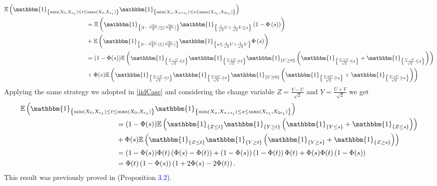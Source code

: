 \documentclass[12pt]{article}
\theoremstyle{Theorem}
\theoremstyle{definition}
\begin{document}
{\small
\begin{align*}
\mathbb{E}\left(\mathbbm{1}_{\left\{\min(X_{\scriptscriptstyle 0}, X_{e_1}) \leq t \leq \max(X_{\scriptscriptstyle 0}, X_{e_1})\right\}}\mathbbm{1}_{\left\{\min(X_{\scriptscriptstyle x}, X_{x+e_i}) \leq s \leq \max(X_{e_1}, X_{2e_1}) \right\}}\right) & \\
& \hspace{-9cm} = \mathbb{E}\left(\mathbbm{1}_{\left\{ |t - \frac{\sqrt{2}V}{2}| \leq |\frac{\sqrt{2}U}{2}|\right\}}\mathbbm{1}_{\left\{\frac{1}{\sqrt{2}} U + \frac{1}{\sqrt{2}}V \leq s\right\}} \left(1 - \Phi\left(s\right)\right)\right) \\
& \hspace{-9cm} + \mathbb{E}\left(\mathbbm{1}_{\left\{ |t - \frac{\sqrt{2}V}{2}| \leq |\frac{\sqrt{2}U}{2}|\right\}}\mathbbm{1}_{\left\{ s \leq \frac{1}{\sqrt{2}}U + \frac{1}{\sqrt{2}}V \right\}}\Phi\left(s\right)\right) \\
& \hspace{-9cm} = (1-\Phi(s))\mathbb{E}\left(\mathbbm{1}_{\left\{\frac{V-U}{\sqrt{2}} \leq t \right\}}\mathbbm{1}_{\left\{\frac{V+U}{\sqrt{2}} \geq t \right\}}\mathbbm{1}_{\left\{U \geq 0\right\}}\left(\mathbbm{1}_{\left\{\frac{V+U}{\sqrt{2}} \leq s \right\}} + \mathbbm{1}_{\left\{\frac{V-U}{\sqrt{2}} \leq s \right\}}\right) \right)\\
& \hspace{-9cm} + \Phi(s)\mathbb{E}\left(\mathbbm{1}_{\left\{\frac{V-U}{\sqrt{2}} \leq t \right\}}\mathbbm{1}_{\left\{\frac{V+U}{\sqrt{2}} \geq t \right\}}\mathbbm{1}_{\left\{U \geq 0\right\}}\left(\mathbbm{1}_{\left\{\frac{V+U}{\sqrt{2}} \geq s \right\}} + \mathbbm{1}_{\left\{\frac{V-U}{\sqrt{2}} \geq s \right\}}\right) \right)
\end{align*}}
Applying the same strategy we adopted in \ref{iidCase} and considering the change variable $Z = \frac{V-U}{\sqrt{2}}$ and $Y = \frac{U+V}{\sqrt{2}}$ we get 
{\small
\begin{align*}
\mathbb{E}\left(\mathbbm{1}_{\left\{\min(X_{\scriptscriptstyle 0}, X_{e_1}) \leq t \leq \max(X_{\scriptscriptstyle 0}, X_{e_1})\right\}}\mathbbm{1}_{\left\{\min(X_{\scriptscriptstyle x}, X_{x+e_i}) \leq s \leq \max(X_{e_1}, X_{2e_1}) \right\}}\right) & \\
& \hspace{-9cm} = (1-\Phi(s))\mathbb{E}\left(\mathbbm{1}_{\left\{Z \leq t \right\}}\mathbbm{1}_{\left\{Y \geq t \right\}}\left(\mathbbm{1}_{\left\{Y \leq s \right\}} + \mathbbm{1}_{\left\{Z \leq s \right\}}\right) \right)\\
& \hspace{-9cm} + \Phi(s)\mathbb{E}\left(\mathbbm{1}_{\left\{Z \leq t \right\}}\mathbbm{1}_{\left\{Y \geq t \right\}}\left(\mathbbm{1}_{\left\{Y \geq s \right\}} + \mathbbm{1}_{\left\{Z \geq s \right\}}\right) \right) \\
& \hspace{-9cm}= (1-\Phi(s))\Phi(t)\left(\Phi(s) - \Phi(t)\right) + (1-\Phi(s))\left(1-\Phi(t)\right)\Phi(t)   + \Phi(s)\Phi(t)\left(1-\Phi(s)\right)\\
& \hspace{-9cm}= \Phi(t)\left(1-\Phi(s)\right)\left(1+ 2\Phi(s) - 2\Phi(t)\right).
\end{align*}}
This result was previously proved in \cite{Psymetrie} (Proposition \textcolor{blue}{3.2}).


\end{document}
